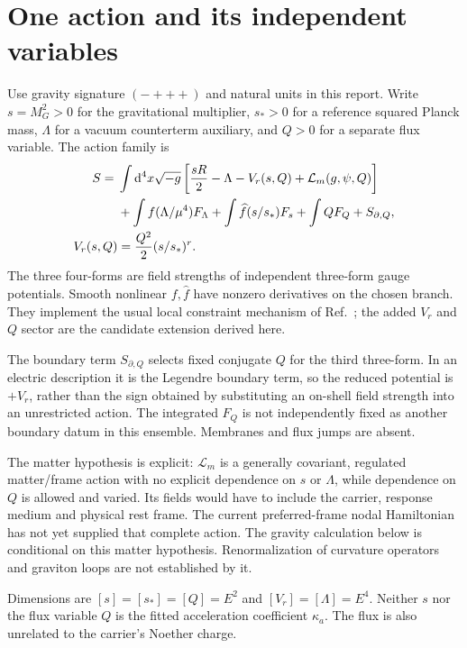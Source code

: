 \documentclass[11pt]{article}
\newcommand{\dd}{\mathrm d}
\begin{document}
\section{One action and its independent variables}
Use gravity signature $(-+++)$ and natural units in this report. Write
$s=M_G^2>0$ for the gravitational multiplier, $s_*>0$ for a reference
squared Planck mass, $\Lambda$ for a vacuum counterterm auxiliary, and
$Q>0$ for a separate flux variable. The action family is
\begin{align}
 S={}&\int\dd^4x\sqrt{-g}\left[{sR\over2}-\Lambda
               -V_r(s,Q)+\mathcal L_m(g,\psi,Q)\right]\nonumber\\
 &+\int f(\Lambda/\mu^4)F_\Lambda
       +\int\widehat f(s/s_*)F_s+\int QF_Q+S_{\partial,Q},\\
 V_r(s,Q)&={Q^2\over2}(s/s_*)^r.
 \label{pf:action}
\end{align}
The three four-forms are field strengths of independent three-form gauge
potentials. Smooth nonlinear $f,\widehat f$ have nonzero derivatives on
the chosen branch. They implement the usual local constraint mechanism
of Ref.~\cite{pf:sequester}; the added $V_r$ and $Q$ sector are the
candidate extension derived here.

The boundary term $S_{\partial,Q}$ selects fixed conjugate $Q$ for the
third three-form. In an electric description it is the Legendre boundary
term, so the reduced potential is $+V_r$, rather than the sign obtained by
substituting an on-shell field strength into an unrestricted action.
The integrated $F_Q$ is not independently fixed as another boundary datum
in this ensemble. Membranes and flux jumps are absent.

The matter hypothesis is explicit: $\mathcal L_m$ is a generally covariant,
regulated matter/frame action with no explicit dependence on $s$ or
$\Lambda$, while dependence on $Q$ is allowed and varied. Its fields
would have to include the carrier, response medium and physical rest frame.
The current preferred-frame nodal Hamiltonian has not yet supplied that
complete action. The gravity calculation below is conditional on this
matter hypothesis. Renormalization of curvature operators and graviton
loops are not established by it.

Dimensions are $[s]=[s_*]=[Q]=E^2$ and $[V_r]=[\Lambda]=E^4$.
Neither $s$ nor the flux variable $Q$ is the fitted acceleration coefficient
$\kappa_a$. The flux is also unrelated to the carrier's Noether charge.
\end{document}
